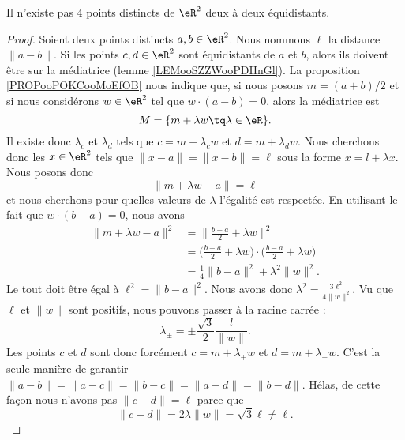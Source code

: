 \begin{proposition}	\label{PROPooIPKSooAOfTDy}
	Il n'existe pas \( 4\) points distincts de \( \eR^2\) deux à deux équidistants.
\end{proposition}

\begin{proof}
	Soient deux points distincts \( a,b\in \eR^2\). Nous nommons \( \ell \) la distance \( \| a-b \|\). Si les points \( c,d\in \eR^2\) sont équidistants de \( a\) et \( b\), alors ils doivent être sur la médiatrice (lemme \ref{LEMooSZZWooPDHnGl}). La proposition \ref{PROPooPOKCooMoEfOB} nous indique que, si nous posons \( m=(a+b)/2\) et si nous considérons \( w\in \eR^2\) tel que \( w\cdot(a-b)=0\), alors la médiatrice est
	\begin{equation}
		M=\{ m+\lambda w\tq \lambda\in \eR \}.
	\end{equation}
	Il existe donc \( \lambda_c\) et \( \lambda_d\) tels que \( c=m+\lambda_c w\) et \( d=m+\lambda_dw\). Nous cherchons donc les \( x\in \eR^2\) tels que \( \| x-a \|=\| x-b \|=\ell\) sous la forme \( x=l+\lambda x\). Nous posons donc
	\begin{equation}
		\| m+\lambda w-a \|=\ell
	\end{equation}
	et nous cherchons pour quelles valeurs de \( \lambda\) l'égalité est respectée. En utilisant le fait que \( w\cdot(b-a)=0\), nous avons
	\begin{subequations}
		\begin{align}
			\| m+\lambda w-a \|^2 & =\| \frac{ b-a }{2}+\lambda w \|^2                                                \\
			                      & =\big( \frac{ b-a }{2}+\lambda w \big)\cdot \big( \frac{ b-a }{2}+\lambda w \big) \\
			                      & =\frac{1}{ 4}\| b-a \|^2+\lambda^2\| w \|^2.
		\end{align}
	\end{subequations}
	Le tout doit être égal à \( \ell^2=\| b-a \|^2\). Nous avons donc \( \lambda^2=\frac{ 3\ell^2 }{ 4\| w \|^2 }\). Vu que \( \ell\) et \( \| w \|\) sont positifs, nous pouvons passer à la racine carrée :
	\begin{equation}
		\lambda_{\pm}=\pm\frac{ \sqrt{3} }{ 2 }\frac{ l }{ \| w \| }.
	\end{equation}
	Les points \( c\) et \( d\) sont donc forcément \( c=m+\lambda_+w\) et \(d=m+\lambda_-w \). C'est la seule manière de garantir \( \| a-b \|=\| a-c \|=\| b-c \|=\| a-d \|=\| b-d \|\). Hélas, de cette façon nous n'avons pas \( \| c-d \|=\ell\) parce que
	\begin{equation}
		\| c-d \|=2\lambda \| w \|=\sqrt{3}\ell\neq \ell.
	\end{equation}
\end{proof}


